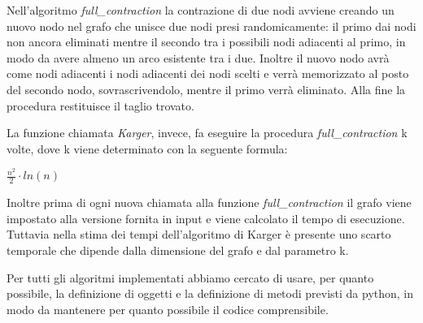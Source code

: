 Nell'algoritmo \textit{full\_contraction} la contrazione di due nodi avviene creando un nuovo nodo nel grafo che unisce due nodi presi randomicamente: il primo dai nodi non ancora eliminati mentre il secondo tra i possibili nodi adiacenti al primo, in modo da avere almeno un arco esistente tra i due.
Inoltre il nuovo nodo avrà come nodi adiacenti i nodi adiacenti dei nodi scelti e verrà memorizzato al posto del secondo nodo, sovrascrivendolo, mentre il primo verrà eliminato.
Alla fine la procedura restituisce il taglio trovato.

La funzione chiamata \textit{Karger}, invece, fa eseguire la procedura \textit{full\_contraction} k volte, dove k viene determinato con la seguente formula: 

\centerline{\(\frac{n^{2}}{2}\cdot ln(n)\)}

Inoltre prima di ogni nuova chiamata alla funzione \textit{full\_contraction} il grafo viene impostato alla versione fornita in input e viene calcolato il tempo di esecuzione. Tuttavia nella stima dei tempi dell'algoritmo di Karger è presente uno scarto temporale che dipende dalla dimensione del grafo e dal parametro k.

Per tutti gli algoritmi implementati abbiamo cercato di usare, per quanto possibile, la definizione di oggetti e la definizione di metodi previsti da python, in modo da mantenere per quanto possibile il codice comprensibile.